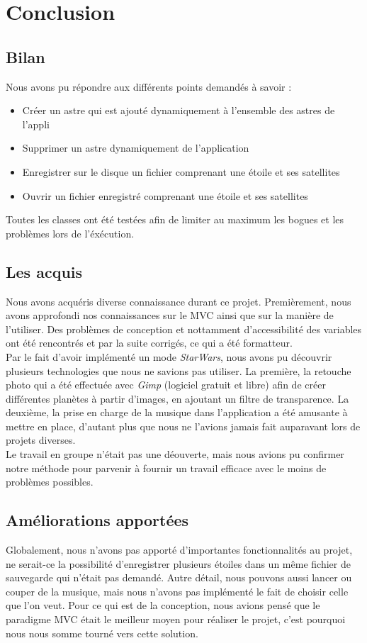 \documentclass[a4paper,10pt]{article}
\begin{document}
\newpage
\newpage
\section{Conclusion}
\subsection{Bilan}
Nous avons pu répondre aux différents points demandés à savoir :
\begin{itemize}
 \item Créer un astre qui est ajouté dynamiquement à l'ensemble des astres de l'appli
 \item Supprimer un astre dynamiquement de l'application
 \item Enregistrer sur le disque un fichier comprenant une étoile et ses satellites
 \item Ouvrir un fichier enregistré comprenant une étoile et ses satellites
\end{itemize}

Toutes les classes ont été testées afin de limiter au maximum les bogues et les problèmes lors de l'éxécution.


\subsection{Les acquis}
Nous avons acquéris diverse connaissance durant ce projet. Premièrement, nous avons approfondi nos connaissances sur le MVC ainsi que sur la manière de l'utiliser. Des problèmes de conception et nottamment d'accessibilité des variables ont été rencontrés et par la suite corrigés, ce qui a été formatteur.
\\

Par le fait d'avoir implémenté un mode \textit{StarWars}, nous avons pu découvrir plusieurs technologies que nous ne savions pas utiliser. La première, la retouche photo qui a été effectuée avec \textit{Gimp} (logiciel gratuit et libre) afin de créer différentes planètes à partir d'images, en ajoutant un filtre de transparence. La deuxième, la prise en charge de la musique dans l'application a été amusante à mettre en place, d'autant plus que nous ne l'avions jamais fait auparavant lors de projets diverses.
\\

Le travail en groupe n'était pas une déouverte, mais nous avions pu confirmer notre méthode pour parvenir à fournir un travail efficace avec le moins de problèmes possibles.

\subsection{Améliorations apportées}
Globalement, nous n'avons pas apporté d'importantes fonctionnalités au projet, ne serait-ce la possibilité d'enregistrer plusieurs étoiles dans un même fichier de sauvegarde qui n'était pas demandé. Autre détail, nous pouvons aussi lancer ou couper de la musique, mais nous n'avons pas implémenté le fait de choisir celle que l'on veut. Pour ce qui est de la conception, nous avions pensé que le paradigme MVC était le meilleur moyen pour réaliser le projet, c'est pourquoi nous nous somme tourné vers cette solution. 
\end{document}
